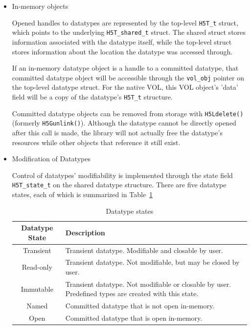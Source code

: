 \begin{itemize}
    \item In-memory objects

Opened handles to datatypes are represented by the top-level \texttt{H5T\_t} struct, which points to the underlying \texttt{H5T\_shared\_t} struct. The shared struct stores information associated with the datatype itself, while the top-level struct stores information about the location the datatype was accessed through.

If an in-memory datatype object is a handle to a committed datatype, that committed datatype object will be accessible through the \texttt{vol\_obj} pointer on the top-level datatype struct. For the native VOL, this VOL object's 'data' field will be a copy of the datatype's \texttt{H5T\_t} structure.

Committed datatype objects can be removed from storage with \texttt{H5Ldelete()} (formerly \texttt{H5Gunlink()}). Although the datatype cannot be directly opened after this call is made, the library will not actually free the datatype's resources while other objects that reference it still exist.

    \item Modification of Datatypes

Control of datatypes' modifiability is implemented through the state field \texttt{H5T\_state\_t} on the shared datatype structure. There are five datatype states, each of which is summarized in Table~\ref{table:datatype-states}

\begin{table}[h!]
\begin{tabular}{||c|m{}||}
\hline
\textbf{Datatype State} & \textbf{Description} \\  [0.5ex] 
\hline\hline
Transient & Transient datatype. Modifiable and closable by user. \\
\hline
Read-only & Transient datatype. Not modifiable, but may be closed by user.  \\
\hline
Immutable & Transient datatype. Not modifiable or closable by user. Predefined types are created with this state. \\
\hline
Named & Committed datatype that is not open in-memory. \\
\hline
Open & Committed datatype that is open in-memory. \\
\hline
\end{tabular}
\caption{Datatype states}
\label{table:datatype-states}
\end{table}


\end{itemize}
